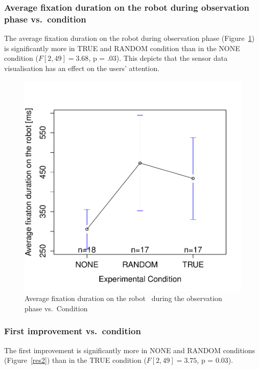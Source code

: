 \documentclass{sig-alternate}
\begin{document}
\subsubsection{Average fixation duration on the robot during observation phase
vs.~condition}

The average fixation duration on the robot during observation phase
(Figure~\ref{res1}) is significantly more in {\sf TRUE} and {\sf RANDOM} condition than in
the {\sf NONE} condition ($F[2,49]=3.68$, p = .03). This depicts that the
sensor data visualisation has an effect on the users' attention.

\begin{figure}[h!]
    \centering
    \includegraphics[width=0.8\linewidth]{meanPlotFixRobo}
    \caption{Average fixation duration on the robot ~during the observation phase
    vs.~Condition}
    \label{res1}
\end{figure}

\subsubsection{First improvement vs.~condition}

The first improvement is significantly more in {\sf NONE} and {\sf RANDOM}
conditions (Figure~\ref{res2}) than in the {\sf TRUE} condition ($F[2,49]=3.75$, p =
0.03).
\end{document}
